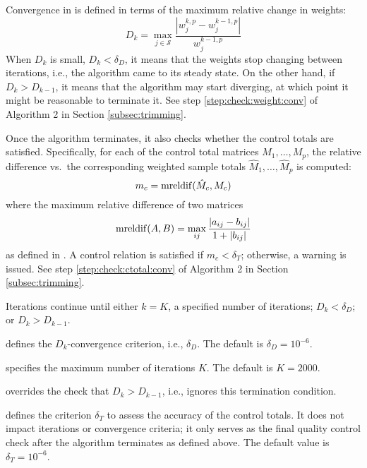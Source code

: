 \begin{sttech}
Convergence in  is defined in terms of the maximum relative
change in weights:
\begin{equation}
    D_k = \max_{j \in \mathcal{S}} \frac{|w_j^{k,p}-w_j^{k-1,p}|}{w_j^{k-1,p}}
    \label{eq:conv:ratio:weights}
\end{equation}
When $D_k$ is small, $D_k < \delta_D$, it means that the weights stop
changing between iterations, i.e., the algorithm came to its steady state.
On the other hand, if $D_k > D_{k-1}$, it means that the algorithm
may start diverging, at which point it might be reasonable to terminate it.
See step \ref{step:check:weight:conv} of Algorithm 2 in Section \ref{subsec:trimming}.

Once the algorithm terminates, it also checks whether the control totals
are satisfied. Specifically, for each of the control total matrices
$M_1, \ldots, M_p$, the relative difference vs.\ the corresponding weighted
sample totals $\hat M_1, \ldots, \hat M_p$ is computed:
\begin{equation}
    m_c = {\rm mreldif}( \hat M_c, M_c )
    \label{eq:conv:mreldif}
\end{equation}
where the maximum relative difference of two matrices
$$
{\rm mreldif}(A,B) = \max_{ij} \frac{|a_{ij}-b_{ij}|}{1+|b_{ij}|}
$$
as defined in . A control relation is satisfied
if $m_c < \delta_T$; otherwise, a warning is issued.
See step \ref{step:check:ctotal:conv} of Algorithm 2 in Section \ref{subsec:trimming}.

Iterations continue until either $k = K$, a specified number of iterations;
$D_k < \delta_D$; or $D_k > D_{k-1}$.
\end{sttech}

\hangpara
{} defines the $D_k$-convergence
criterion, i.e., $\delta_D$. The default is $\delta_D = 10^{-6}$.

\hangpara
{} specifies the maximum number
of iterations $K$. The default is $K=2000$.

\hangpara
{} overrides the check
that $D_k > D_{k-1}$, i.e., ignores this termination condition.

\hangpara
{} defines the criterion $\delta_T$ to
assess the accuracy of the control totals. It does not impact
iterations or convergence criteria; it only serves as the final quality control check
after the algorithm terminates as defined above. The default value is $\delta_T=10^{-6}$.

